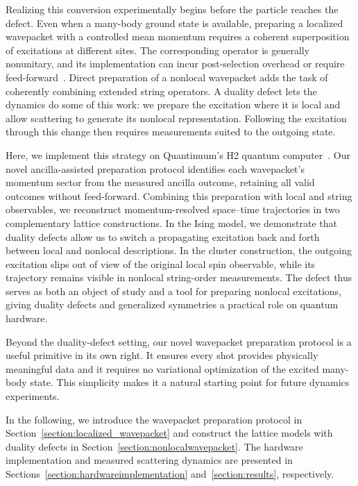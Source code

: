 \documentclass[aps,floatfix,10pt,amssymb,amsfont,amsmath,superscriptaddress,float,nofootinbib,longbibliography,nobalancelastpage,twocolumn]{revtex4-2}
\begin{document}
Realizing this conversion experimentally begins before the particle reaches the defect. Even when a many-body ground state is available, preparing a localized wavepacket with a controlled mean momentum requires a coherent superposition of excitations at different sites. The corresponding operator is generally nonunitary, and its implementation can incur post-selection overhead or require feed-forward~\cite{childs2012hamiltonian,turco2025creation,Gily_n_2019,mcardle2026quantum,o2025quantum,corcoles2021exploiting,pino2021demonstration,farrell2026digital,davoudi2024scattering}. Direct preparation of a nonlocal wavepacket adds the task of coherently combining extended string operators. A duality defect lets the dynamics do some of this work: we prepare the excitation where it is local and allow scattering to generate its nonlocal representation. Following the excitation through this change then requires measurements suited to the outgoing state.

Here, we implement this strategy on Quantinuum's H2 quantum computer~\cite{PhysRevX.13.041052}. Our novel ancilla-assisted preparation protocol identifies each wavepacket's momentum sector from the measured ancilla outcome, retaining all valid outcomes without feed-forward. Combining this preparation with local and string observables, we reconstruct momentum-resolved space--time trajectories in two complementary lattice constructions. In the Ising model, we demonstrate that duality defects allow us to switch a propagating excitation back and forth between local and nonlocal descriptions. In the cluster construction, the outgoing excitation slips out of view of the original local spin observable, while its trajectory remains visible in nonlocal string-order measurements. The defect thus serves as both an object of study and a tool for preparing nonlocal excitations, giving duality defects and generalized symmetries a practical role on quantum hardware.

Beyond the duality-defect setting, our novel wavepacket preparation protocol is a useful primitive in its own right. It ensures every shot provides physically meaningful data and it requires no variational optimization of the excited many-body state. This simplicity makes it a natural starting point for future dynamics experiments.

In the following, we introduce the wavepacket preparation protocol in Section~\ref{section:localized_wavepacket} and construct the lattice models with duality defects in Section~\ref{section:nonlocalwavepacket}. The hardware implementation and measured scattering dynamics are presented in Sections~\ref{section:hardwareimplementation} and~\ref{section:results}, respectively.
\end{document}
